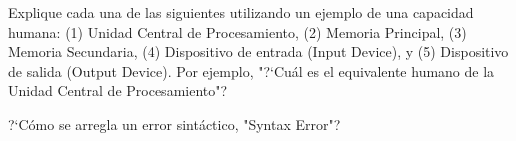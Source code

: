 \begin{ex}
Explique cada una de las siguientes utilizando un ejemplo de una capacidad humana: 
(1) Unidad Central de Procesamiento, (2) Memoria Principal, (3) Memoria Secundaria, 
(4) Dispositivo de entrada (Input Device), y 
(5) Dispositivo de salida (Output Device).
Por ejemplo, "?`Cu\'al es el equivalente humano de la Unidad Central de Procesamiento"? 
\end{ex}

\begin{ex}
?`C\'omo se arregla un error sint\'actico, "Syntax Error"?
\end{ex}

